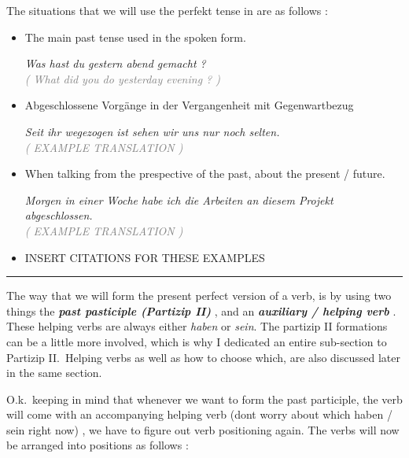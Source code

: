 \documentclass[a4paper,twocolumn,10pt]{article}
\newcommand{\newpar}
{\par \vspace{0.3cm}}
\begin{document}
The situations that we will use the perfekt tense in are as follows :

\begin{itemize}[noitemsep]

	\item The main past tense used in the spoken form.
	
	
	\noindent
	\textit{Was hast du gestern abend gemacht ?}\\
	\textcolor{gray} { \textit{( What did you do yesterday evening ? )} } \newpar 

	\item Abgeschlossene Vorgänge in der Vergangenheit mit Gegenwartbezug
	
	
	\noindent
	\textit{Seit ihr wegezogen ist sehen wir uns nur noch selten.}\\
	\textcolor{gray} { \textit{( EXAMPLE TRANSLATION )} } \newpar

	\item When talking from the prespective of the past, about the present /
		future.

	
	\noindent
	\textit{Morgen in einer Woche habe ich die Arbeiten an diesem Projekt
		abgeschlossen.}\\
	\textcolor{gray} { \textit{( EXAMPLE TRANSLATION )} } \newpar
	

	\item INSERT CITATIONS FOR THESE EXAMPLES
			
\end{itemize}

\hrule

The way that we will form the present perfect version of a verb, is by using two
things the \textbf{\textit{past pasticiple (Partizip II)}} , and an
\textbf{\textit{auxiliary / helping verb}} .  These helping verbs are always
either \textit{haben} or \textit{sein}. The partizip II formations can be a
little more involved, which is why I dedicated an entire sub-section to Partizip
II.\ Helping verbs as well as how to choose which, are also discussed later in
the same section.\newpar

O.k.\ keeping in mind that whenever we want to form the past participle, the
verb will come with an accompanying helping verb (dont worry about which haben /
sein right now) , we have to figure out verb positioning again. The verbs will
now be arranged into positions as follows :\newpar


\end{document}
